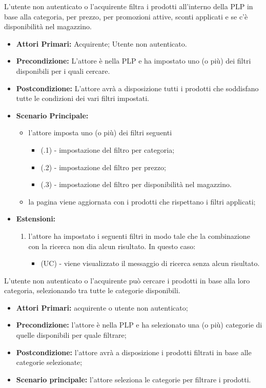 L'utente non autenticato o l'acquirente filtra i prodotti all'interno della PLP in base alla categoria, per prezzo, per promozioni attive, sconti applicati e se c'è disponibilità nel magazzino.
\begin{itemize}
    \item \textbf{Attori Primari:} Acquirente; Utente non autenticato.
    \item \textbf{Precondizione:} L'attore è nella PLP e ha impostato uno (o più) dei filtri disponibili per i quali cercare.
    \item \textbf{Postcondizione:} L'attore avrà a disposizione tutti i prodotti che soddisfano tutte le condizioni dei vari filtri impostati.
    \item \textbf{Scenario Principale:}
    \begin{itemize}
        \item l'attore imposta uno (o più) dei filtri seguenti 
        \begin{itemize}
            \item (\actualUC.1) - impostazione del filtro per categoria;
            \item (\actualUC.2) - impostazione del filtro per prezzo;
            \item (\actualUC.3) - impostazione del filtro per disponibilità nel magazzino.
        \end{itemize}
        \item la pagina viene aggiornata con i prodotti che rispettano i filtri applicati;
    \end{itemize}
    \item \textbf{Estensioni:}
    \begin{enumerate}
        \item l'attore ha impostato i seguenti filtri in modo tale che la combinazione con la ricerca non dia alcun risultato. In questo caso:
        \begin{itemize}
            \item (UC) - viene visualizzato il messaggio di ricerca senza alcun risultato.
        \end{itemize}
    \end{enumerate}
\end{itemize}

\resetSubUC

L'utente non autenticato o l'acquirente può cercare i prodotti in base alla loro categoria, selezionando tra tutte le categorie disponibili.
\begin{itemize}
    \item \textbf{Attori Primari:} acquirente o utente non autenticato;
    \item \textbf{Precondizione:} l'attore è nella PLP e ha selezionato una (o più) categorie di quelle disponibili per quale filtrare;
    \item \textbf{Postcondizione:} l'attore avrà a disposizione i prodotti filtrati in base alle categorie selezionate;
    \item \textbf{Scenario principale:} l'attore seleziona le categorie per filtrare i prodotti.
\end{itemize}

